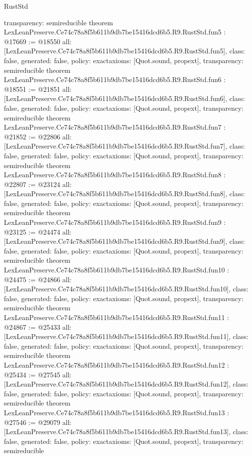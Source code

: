 \begin{lexlean}{RustStd}
\begin{coremodule}
{  transparency: semireducible
}
theorem LexLeanPreserve.Ce74c78a8f5b611b9db7be15416dcd6b5.R9.RustStd.fun5 : @17669 := @18550 {
  all: [LexLeanPreserve.Ce74c78a8f5b611b9db7be15416dcd6b5.R9.RustStd.fun5],
  class: false,
  generated: false,
  policy: exact{axioms: [Quot.sound, propext]},
  transparency: semireducible
}
theorem LexLeanPreserve.Ce74c78a8f5b611b9db7be15416dcd6b5.R9.RustStd.fun6 : @18551 := @21851 {
  all: [LexLeanPreserve.Ce74c78a8f5b611b9db7be15416dcd6b5.R9.RustStd.fun6],
  class: false,
  generated: false,
  policy: exact{axioms: [Quot.sound, propext]},
  transparency: semireducible
}
theorem LexLeanPreserve.Ce74c78a8f5b611b9db7be15416dcd6b5.R9.RustStd.fun7 : @21852 := @22806 {
  all: [LexLeanPreserve.Ce74c78a8f5b611b9db7be15416dcd6b5.R9.RustStd.fun7],
  class: false,
  generated: false,
  policy: exact{axioms: [Quot.sound, propext]},
  transparency: semireducible
}
theorem LexLeanPreserve.Ce74c78a8f5b611b9db7be15416dcd6b5.R9.RustStd.fun8 : @22807 := @23124 {
  all: [LexLeanPreserve.Ce74c78a8f5b611b9db7be15416dcd6b5.R9.RustStd.fun8],
  class: false,
  generated: false,
  policy: exact{axioms: [Quot.sound, propext]},
  transparency: semireducible
}
theorem LexLeanPreserve.Ce74c78a8f5b611b9db7be15416dcd6b5.R9.RustStd.fun9 : @23125 := @24474 {
  all: [LexLeanPreserve.Ce74c78a8f5b611b9db7be15416dcd6b5.R9.RustStd.fun9],
  class: false,
  generated: false,
  policy: exact{axioms: [Quot.sound, propext]},
  transparency: semireducible
}
theorem LexLeanPreserve.Ce74c78a8f5b611b9db7be15416dcd6b5.R9.RustStd.fun10 : @24475 := @24866 {
  all: [LexLeanPreserve.Ce74c78a8f5b611b9db7be15416dcd6b5.R9.RustStd.fun10],
  class: false,
  generated: false,
  policy: exact{axioms: [Quot.sound, propext]},
  transparency: semireducible
}
theorem LexLeanPreserve.Ce74c78a8f5b611b9db7be15416dcd6b5.R9.RustStd.fun11 : @24867 := @25433 {
  all: [LexLeanPreserve.Ce74c78a8f5b611b9db7be15416dcd6b5.R9.RustStd.fun11],
  class: false,
  generated: false,
  policy: exact{axioms: [Quot.sound, propext]},
  transparency: semireducible
}
theorem LexLeanPreserve.Ce74c78a8f5b611b9db7be15416dcd6b5.R9.RustStd.fun12 : @25434 := @27545 {
  all: [LexLeanPreserve.Ce74c78a8f5b611b9db7be15416dcd6b5.R9.RustStd.fun12],
  class: false,
  generated: false,
  policy: exact{axioms: [Quot.sound, propext]},
  transparency: semireducible
}
theorem LexLeanPreserve.Ce74c78a8f5b611b9db7be15416dcd6b5.R9.RustStd.fun13 : @27546 := @29079 {
  all: [LexLeanPreserve.Ce74c78a8f5b611b9db7be15416dcd6b5.R9.RustStd.fun13],
  class: false,
  generated: false,
  policy: exact{axioms: [Quot.sound, propext]},
  transparency: semireducible
}
\end{coremodule}
\end{lexlean}
